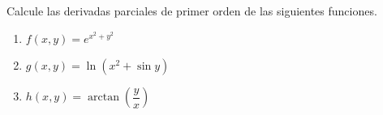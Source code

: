 Calcule las derivadas parciales de primer orden de las siguientes funciones.
\begin{enumerate}
    \item $f(x, y) = e^{x^2 + y^2}$
    \item $g(x, y) = \ln\!\left(x^2 + \sin y\right)$
    \item $h(x, y) = \arctan\!\left(\dfrac{y}{x}\right)$
\end{enumerate}
